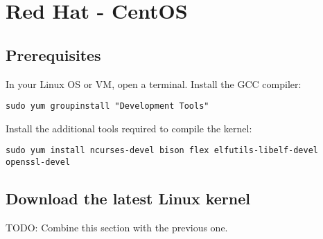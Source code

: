 \documentclass[12pt,a4paper]{report}
\begin{document}
\chapter{Red Hat - CentOS}

\section{Prerequisites}
In your Linux OS or VM, open a terminal. Install the GCC compiler:
\newline
\newline
\centerline{\texttt{sudo yum groupinstall "Development Tools"}}
\newline
\newline 
Install the additional tools required to compile the kernel:
\newline
\newline
\centerline{\texttt{\scriptsize sudo yum install ncurses-devel bison flex elfutils-libelf-devel openssl-devel}}


\section{Download the latest Linux kernel}
TODO: Combine this section with the previous one.
\end{document}
